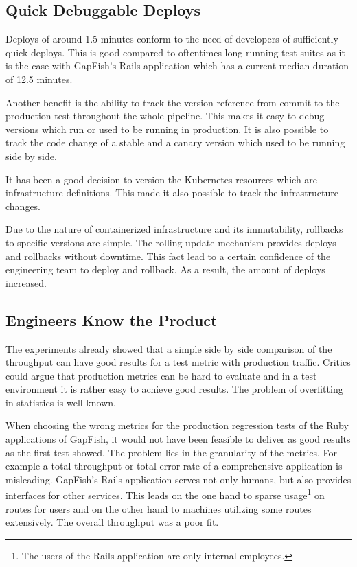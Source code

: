 \subsection{Quick Debuggable Deploys}

Deploys of around 1.5 minutes conform to the need of developers of sufficiently quick
deploys. This is good compared to oftentimes long running test suites as it is the case with
GapFish's Rails application which has a current median duration of 12.5 minutes.

Another benefit is the ability to track the version reference from commit to the production
test throughout the whole pipeline. This makes it easy to debug versions
which run or used to be running in production. It is also possible to track the code
change of a stable and a canary version which used to be running side by side.

It has been a good decision to version the Kubernetes resources which are
infrastructure definitions. This made it also possible to track the
infrastructure changes.

Due to the nature of containerized infrastructure and its immutability, rollbacks to
specific versions are simple. The rolling update mechanism provides deploys and rollbacks
without downtime. This fact lead to a certain confidence of the engineering team to deploy
and rollback. As a result, the amount of deploys increased.

\subsection{Engineers Know the Product}

The experiments already showed that a simple side by side comparison of the throughput can
have good results for a test metric with production traffic. Critics could argue that
production metrics can be hard to evaluate and in a test environment it is rather easy to
achieve good results. The problem of overfitting in statistics is well known.

When choosing the wrong metrics for the production regression tests of the Ruby
applications of GapFish, it would not have been feasible to deliver as good results as the
first test showed. The problem lies in the granularity of the metrics. For example a total
throughput or total error rate of a comprehensive application is misleading. GapFish's
Rails application serves not only humans, but also provides interfaces for other
services. This leads on the one hand to sparse usage\footnote{The users of the Rails
  application are only internal employees.} on routes for users and on the other hand
to machines utilizing some routes extensively. The overall throughput was a poor fit.


